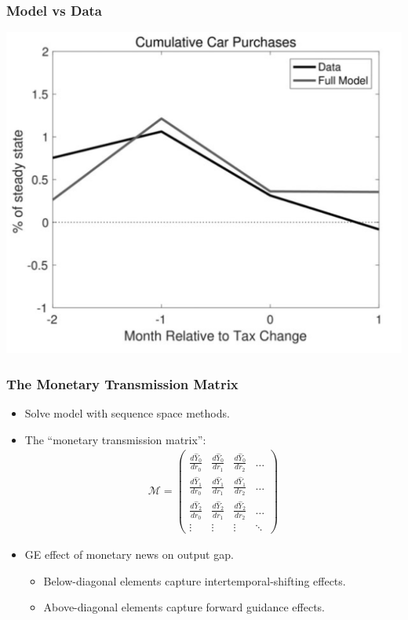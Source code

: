 \documentclass[english,xcolor=svgnames]{beamer}
\begin{document}
\begin{frame}
    \frametitle{Model vs Data}
    \begin{center}
    	\includegraphics[scale=0.3]{figures/MWFIG6.png}	
    \end{center}
\end{frame}


\begin{frame}\frametitle{The Monetary Transmission Matrix}
\begin{itemize}
\item Solve model with sequence space methods. 
\item The ``monetary transmission matrix'':
\begin{align*}
  \mathcal{M} =\begin{pmatrix}
    \frac{d \hat{Y}_0}{d r_0} & \frac{d \hat{Y}_0}{d r_{1}} & \frac{d \hat{Y}_0}{d r_{2}} & \hdots \\
    \frac{d \hat{Y}_{1}}{d r_0} & \frac{d \hat{Y}_1}{d r_{1}} & \frac{d \hat{Y}_1}{d r_{2}} & \hdots \\
    \frac{d \hat{Y}_{2}}{d r_0} & \frac{d \hat{Y}_2}{d r_{1}} & \frac{d \hat{Y}_2}{d r_{2}} & \hdots \\
    \vdots & \vdots & \vdots & \ddots 
  \end{pmatrix}
\end{align*}
\item GE effect of monetary news on output gap.\\
\begin{itemize}
	\item Below-diagonal elements capture intertemporal-shifting effects.
	\item Above-diagonal elements capture forward guidance effects.
\end{itemize}
\end{itemize}
\end{frame}
\end{document}
